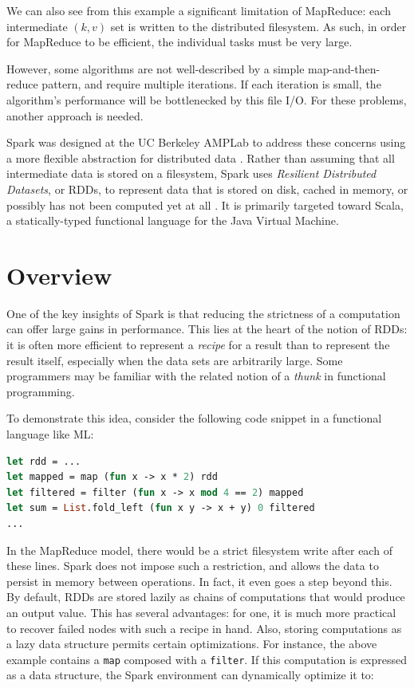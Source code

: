 \documentclass{article}
\begin{document}
We can also see from this example a significant limitation of MapReduce: each
intermediate $(k, v)$ set is written to the distributed filesystem.  As such,
in order for MapReduce to be efficient, the individual tasks must be very
large.

However, some algorithms are not well-described by a simple map-and-then-reduce
pattern, and require multiple iterations.  If each iteration is small, the
algorithm's performance will be bottlenecked by this file I/O. For these
problems, another approach is needed.

Spark was designed at the UC Berkeley AMPLab to address these concerns using a
more flexible abstraction for distributed data \citep{zaharia}. Rather than
assuming that all intermediate data is stored on a filesystem, Spark uses
\emph{Resilient Distributed Datasets}, or RDDs, to represent data that is
stored on disk, cached in memory, or possibly has not been computed yet at all
\citep{zaharia_rdd}.  It is primarily targeted toward Scala, a statically-typed
functional language for the Java Virtual Machine.

\section{Overview}
One of the key insights of Spark is that reducing the strictness of a
computation can offer large gains in performance. This lies at the heart
of the notion of RDDs: it is often more efficient to represent a \emph{recipe}
for a result than to represent the result itself, especially when the data sets
are arbitrarily large. Some programmers may be familiar with the related
notion of a \emph{thunk} in functional programming.

To demonstrate this idea, consider the following code snippet in a
functional language like ML:

\begin{lstlisting}[language=ML]
let rdd = ...
let mapped = map (fun x -> x * 2) rdd
let filtered = filter (fun x -> x mod 4 == 2) mapped
let sum = List.fold_left (fun x y -> x + y) 0 filtered
...
\end{lstlisting}

In the MapReduce model, there would be a strict filesystem write after each of
these lines.  Spark does not impose such a restriction, and allows the data to
persist in memory between operations. In fact, it even goes a step beyond this.
By default, RDDs are stored lazily as chains of computations that would
produce an output value. This has several advantages: for one, it is much
more practical to recover failed nodes with such a recipe in hand. Also,
storing computations as a lazy data structure permits certain optimizations.
For instance, the above example contains a \texttt{map} composed with a
\texttt{filter}. If this computation is expressed as a data structure,
the Spark environment can dynamically optimize it to:
\end{document}
